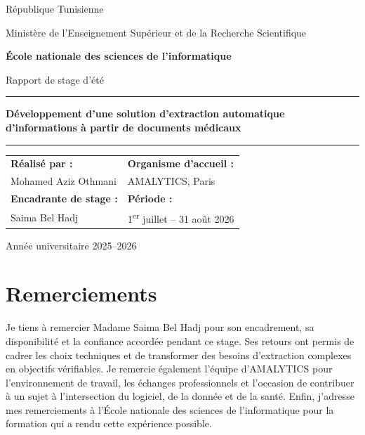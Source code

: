 \begin{titlepage}
\centering
{\Large République Tunisienne\par}
\vspace{0.2cm}
{\large Ministère de l'Enseignement Supérieur et de la Recherche Scientifique\par}
\vspace{0.5cm}
{\Large\bfseries École nationale des sciences de l'informatique\par}
\vspace{1.6cm}
{\large Rapport de stage d'été\par}
\vspace{0.8cm}
{\color{ensiblue}\rule{\textwidth}{1.2pt}\par}
\vspace{0.45cm}
{\LARGE\bfseries Développement d'une solution d'extraction automatique d'informations à partir de documents médicaux\par}
\vspace{0.45cm}
{\color{ensiblue}\rule{\textwidth}{1.2pt}\par}
\vfill
\begin{tabular}{p{}p{}}
\textbf{Réalisé par :} & \textbf{Organisme d'accueil :}\\
Mohamed Aziz Othmani & AMALYTICS, Paris\\[0.5cm]
\textbf{Encadrante de stage :} & \textbf{Période :}\\
Saima Bel Hadj & 1\textsuperscript{er} juillet -- 31 août 2026
\end{tabular}
\vfill
{\large Année universitaire 2025--2026\par}
\end{titlepage}

\chapter*{Remerciements}
Je tiens à remercier Madame Saima Bel Hadj pour son encadrement, sa disponibilité et la confiance accordée pendant ce stage. Ses retours ont permis de cadrer les choix techniques et de transformer des besoins d'extraction complexes en objectifs vérifiables. Je remercie également l'équipe d'AMALYTICS pour l'environnement de travail, les échanges professionnels et l'occasion de contribuer à un sujet à l'intersection du logiciel, de la donnée et de la santé. Enfin, j'adresse mes remerciements à l'École nationale des sciences de l'informatique pour la formation qui a rendu cette expérience possible.

